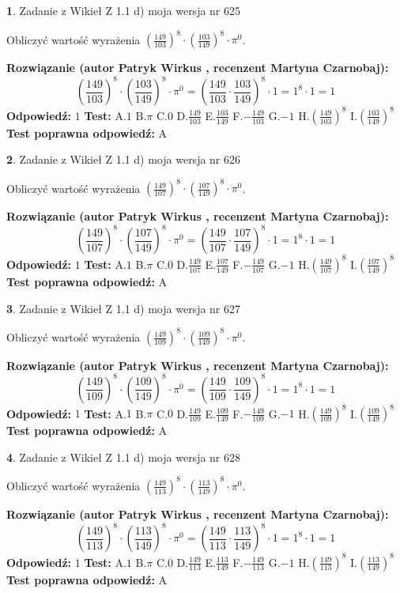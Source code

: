 \documentclass[12pt, a4paper]{article}
\theoremstyle{definition} %
\newtheorem{zad}{}
\newcommand{\zadStart}[1]{\begin{zad}#1\newline}
\newcommand{\zadStop}{\end{zad}}
\newcommand{\rozwStart}[2]{\noindent \textbf{Rozwiązanie (autor #1 , recenzent #2): }\newline}
\newcommand{\rozwStop}{\newline}
\newcommand{\odpStart}{\noindent \textbf{Odpowiedź:}\newline}
\newcommand{\odpStop}{\newline}
\newcommand{\testStart}{\noindent \textbf{Test:}\newline}
\newcommand{\testStop}{\newline}
\newcommand{\kluczStart}{\noindent \textbf{Test poprawna odpowiedź:}\newline}
\newcommand{\kluczStop}{\newline}
\begin{document}
\zadStart{Zadanie z Wikieł Z 1.1 d) moja wersja nr 625}

Obliczyć wartość wyrażenia $(\frac{149}{103})^{8} \cdot (\frac{103}{149})^{8} \cdot \pi^{0}$.
\zadStop
\rozwStart{Patryk Wirkus}{Martyna Czarnobaj}
$$(\frac{149}{103})^{8} \cdot (\frac{103}{149})^{8} \cdot \pi^{0} = (\frac{149}{103} \cdot \frac{103}{149})^{8} \cdot 1 = 1^{8} \cdot 1 = 1$$
\rozwStop
\odpStart
$1$
\odpStop
\testStart
A.$1$ B.$\pi$ C.$0$ D.$\frac{149}{103}$ E.$\frac{103}{149}$
F.$-\frac{149}{103}$ G.$-1$
H.$(\frac{149}{103})^{8}$
I.$(\frac{103}{149})^{8}$
\testStop
\kluczStart
A
\kluczStop



\zadStart{Zadanie z Wikieł Z 1.1 d) moja wersja nr 626}

Obliczyć wartość wyrażenia $(\frac{149}{107})^{8} \cdot (\frac{107}{149})^{8} \cdot \pi^{0}$.
\zadStop
\rozwStart{Patryk Wirkus}{Martyna Czarnobaj}
$$(\frac{149}{107})^{8} \cdot (\frac{107}{149})^{8} \cdot \pi^{0} = (\frac{149}{107} \cdot \frac{107}{149})^{8} \cdot 1 = 1^{8} \cdot 1 = 1$$
\rozwStop
\odpStart
$1$
\odpStop
\testStart
A.$1$ B.$\pi$ C.$0$ D.$\frac{149}{107}$ E.$\frac{107}{149}$
F.$-\frac{149}{107}$ G.$-1$
H.$(\frac{149}{107})^{8}$
I.$(\frac{107}{149})^{8}$
\testStop
\kluczStart
A
\kluczStop



\zadStart{Zadanie z Wikieł Z 1.1 d) moja wersja nr 627}

Obliczyć wartość wyrażenia $(\frac{149}{109})^{8} \cdot (\frac{109}{149})^{8} \cdot \pi^{0}$.
\zadStop
\rozwStart{Patryk Wirkus}{Martyna Czarnobaj}
$$(\frac{149}{109})^{8} \cdot (\frac{109}{149})^{8} \cdot \pi^{0} = (\frac{149}{109} \cdot \frac{109}{149})^{8} \cdot 1 = 1^{8} \cdot 1 = 1$$
\rozwStop
\odpStart
$1$
\odpStop
\testStart
A.$1$ B.$\pi$ C.$0$ D.$\frac{149}{109}$ E.$\frac{109}{149}$
F.$-\frac{149}{109}$ G.$-1$
H.$(\frac{149}{109})^{8}$
I.$(\frac{109}{149})^{8}$
\testStop
\kluczStart
A
\kluczStop



\zadStart{Zadanie z Wikieł Z 1.1 d) moja wersja nr 628}

Obliczyć wartość wyrażenia $(\frac{149}{113})^{8} \cdot (\frac{113}{149})^{8} \cdot \pi^{0}$.
\zadStop
\rozwStart{Patryk Wirkus}{Martyna Czarnobaj}
$$(\frac{149}{113})^{8} \cdot (\frac{113}{149})^{8} \cdot \pi^{0} = (\frac{149}{113} \cdot \frac{113}{149})^{8} \cdot 1 = 1^{8} \cdot 1 = 1$$
\rozwStop
\odpStart
$1$
\odpStop
\testStart
A.$1$ B.$\pi$ C.$0$ D.$\frac{149}{113}$ E.$\frac{113}{149}$
F.$-\frac{149}{113}$ G.$-1$
H.$(\frac{149}{113})^{8}$
I.$(\frac{113}{149})^{8}$
\testStop
\kluczStart
A
\kluczStop
\end{document}
